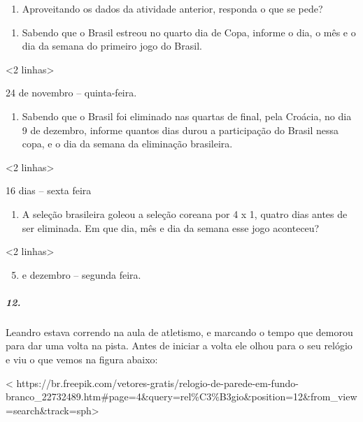 \begin{enumerate}
\def\labelenumi{\arabic{enumi}.}
\item
  Aproveitando os dados da atividade anterior, responda o que se pede?
\end{enumerate}

\begin{enumerate}
\def\labelenumi{\alph{enumi})}
\item
  Sabendo que o Brasil estreou no quarto dia de Copa, informe o dia, o
  mês e o dia da semana do primeiro jogo do Brasil.
\end{enumerate}

\textless{}2 linhas\textgreater{}

24 de novembro -- quinta-feira.

\begin{enumerate}
\def\labelenumi{\alph{enumi})}
\item
  Sabendo que o Brasil foi eliminado nas quartas de final, pela Croácia,
  no dia 9 de dezembro, informe quantos dias durou a participação do
  Brasil nessa copa, e o dia da semana da eliminação brasileira.
\end{enumerate}

\textless{}2 linhas\textgreater{}

16 dias -- sexta feira

\begin{enumerate}
\def\labelenumi{\alph{enumi})}
\item
  A seleção brasileira goleou a seleção coreana por 4 x 1, quatro dias
  antes de ser eliminada. Em que dia, mês e dia da semana esse jogo
  aconteceu?
\end{enumerate}

\textless{}2 linhas\textgreater{}

\begin{enumerate}
\setcounter{enumi}{4}
\item
  e dezembro -- segunda feira.
\end{enumerate}

\subparagraph{12.}\label{section-53}

Leandro estava correndo na aula de atletismo, e marcando o tempo que
demorou para dar uma volta na pista. Antes de iniciar a volta ele olhou
para o seu relógio e viu o que vemos na figura abaixo:

\textless{}
https://br.freepik.com/vetores-gratis/relogio-de-parede-em-fundo-branco\_22732489.htm\#page=4\&query=rel\%C3\%B3gio\&position=12\&from\_view=search\&track=sph\textgreater{}

